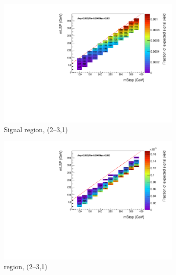\begin{figure}[p]
\begin{subfigure}[b]{0.47\textwidth}
    \includegraphics[width=\textwidth]{Figs/sms/t2degen/v23/effs/T2_4body_had_eff_maps_eq1b_le3j_SITV.pdf}
    \caption{Signal region, (2--3,1)}
    \label{fig:t2_4body_sig_eff_le3j_1b}
  \end{subfigure}
  \begin{subfigure}[b]{0.47\textwidth}
    \includegraphics[width=\textwidth]{Figs/sms/t2degen/v23/effs/T2_4body_muon_eff_maps_eq1b_le3j_SITV.pdf}
    \caption{\mj region, (2--3,1)}
    \label{fig:t2_4body_mu_eff_le3j_1b}
  \end{subfigure} \\
  \begin{subfigure}[b]{0.47\textwidth}

\end{subfigure}
\end{figure}
